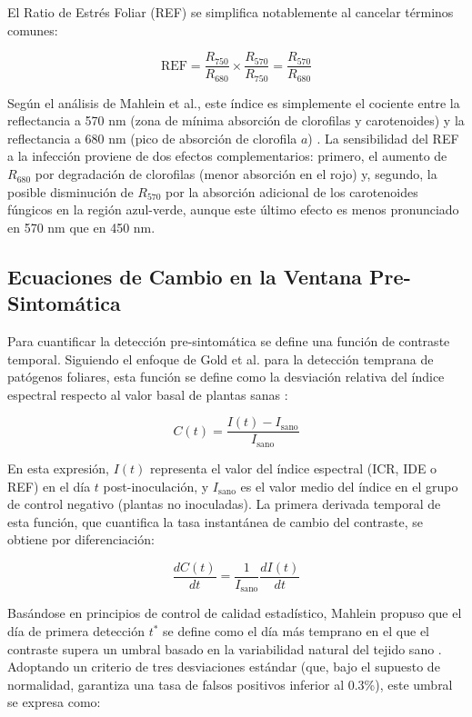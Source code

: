 \documentclass[12pt, a4paper]{article}
\begin{document}
	El Ratio de Estrés Foliar (REF) se simplifica notablemente al cancelar términos comunes:
	
	\begin{equation}
		\text{REF} = \frac{R_{750}}{R_{680}} \times \frac{R_{570}}{R_{750}} = \frac{R_{570}}{R_{680}}
		\label{eq:ref}
	\end{equation}
	
	Según el análisis de Mahlein et al., este índice es simplemente el cociente entre la reflectancia a 570 nm (zona de mínima absorción de clorofilas y carotenoides) y la reflectancia a 680 nm (pico de absorción de clorofila $a$) \parencite{Mahlein2013}. La sensibilidad del REF a la infección proviene de dos efectos complementarios: primero, el aumento de $R_{680}$ por degradación de clorofilas (menor absorción en el rojo) y, segundo, la posible disminución de $R_{570}$ por la absorción adicional de los carotenoides fúngicos en la región azul-verde, aunque este último efecto es menos pronunciado en 570 nm que en 450 nm.
	
	\subsection{Ecuaciones de Cambio en la Ventana Pre-Sintomática}
	
	Para cuantificar la detección pre-sintomática se define una función de contraste temporal. Siguiendo el enfoque de Gold et al. para la detección temprana de patógenos foliares, esta función se define como la desviación relativa del índice espectral respecto al valor basal de plantas sanas \parencite{Gold2020}:
	
	\begin{equation}
		C(t) = \frac{I(t) - I_{\text{sano}}}{I_{\text{sano}}}
		\label{eq:contraste_temporal}
	\end{equation}
	
	En esta expresión, $I(t)$ representa el valor del índice espectral (ICR, IDE o REF) en el día $t$ post-inoculación, y $I_{\text{sano}}$ es el valor medio del índice en el grupo de control negativo (plantas no inoculadas). La primera derivada temporal de esta función, que cuantifica la tasa instantánea de cambio del contraste, se obtiene por diferenciación:
	
	\begin{equation}
		\frac{dC(t)}{dt} = \frac{1}{I_{\text{sano}}} \frac{dI(t)}{dt}
		\label{eq:derivada_contraste}
	\end{equation}
	
	Basándose en principios de control de calidad estadístico, Mahlein propuso que el día de primera detección $t^*$ se define como el día más temprano en el que el contraste supera un umbral basado en la variabilidad natural del tejido sano \parencite{Mahlein2016}. Adoptando un criterio de tres desviaciones estándar (que, bajo el supuesto de normalidad, garantiza una tasa de falsos positivos inferior al 0.3\%), este umbral se expresa como:
	
\end{document}
